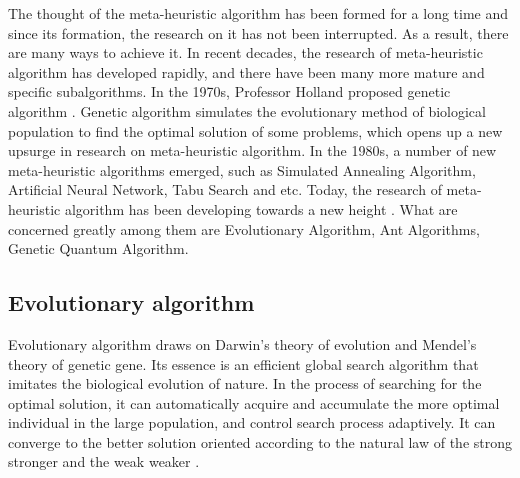 The thought of the meta-heuristic algorithm has been formed for a long time 
and since its formation, the research on it has not been interrupted. As a 
result, there are many ways to achieve it. In recent decades, the research of 
meta-heuristic algorithm has developed rapidly, and there have been many more 
mature and specific subalgorithms. In the 1970s, Professor Holland proposed 
genetic algorithm \cite{holland}. Genetic algorithm simulates the 
evolutionary method of biological population to find the optimal solution of 
some problems, which opens up a new upsurge in research on meta-heuristic 
algorithm. In the 1980s, a number of new meta-heuristic algorithms emerged, 
such as Simulated Annealing Algorithm, Artificial Neural Network, Tabu Search 
and etc. Today, the research of meta-heuristic algorithm has been developing 
towards a new height \cite{harman}. What are concerned greatly among them are 
Evolutionary Algorithm, Ant Algorithms, Genetic Quantum Algorithm.

\subsection{Evolutionary algorithm}

Evolutionary algorithm draws on Darwin's theory of evolution and Mendel's 
theory of genetic gene. Its essence is an efficient global search algorithm 
that imitates the biological evolution of nature. In the process of searching 
for the optimal solution, it can automatically acquire and accumulate the 
more optimal individual in the large population, and control search process 
adaptively. It can converge to the better solution oriented according to the 
natural law of the strong stronger and the weak weaker \cite{deb}.

